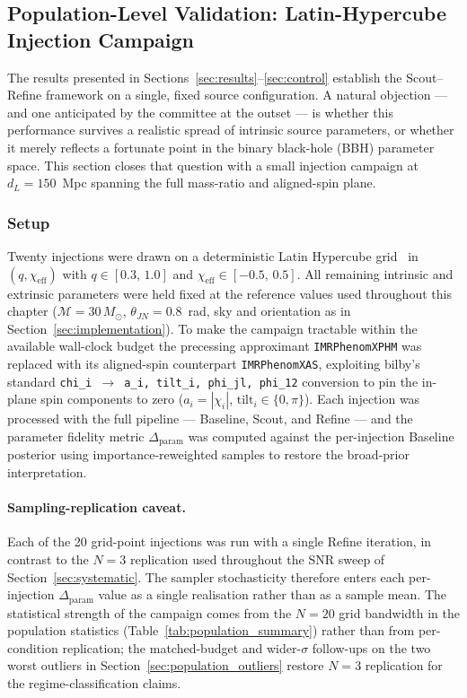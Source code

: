 \documentclass[12pt]{article}
\begin{document}
\clearpage

\subsection{Population-Level Validation: Latin-Hypercube Injection Campaign}
\label{sec:population_validation}

The results presented in Sections~\ref{sec:results}--\ref{sec:control} establish the Scout--Refine framework on a single, fixed source configuration. A natural objection --- and one anticipated by the committee at the outset --- is whether this performance survives a realistic spread of intrinsic source parameters, or whether it merely reflects a fortunate point in the binary black-hole (BBH) parameter space. This section closes that question with a small injection campaign at $d_L = 150$~Mpc spanning the full mass-ratio and aligned-spin plane.

\subsubsection{Setup}
Twenty injections were drawn on a deterministic Latin Hypercube grid~\citep{McKay1979} in $(q, \chi_{\mathrm{eff}})$ with $q \in [0.3,\,1.0]$ and $\chi_{\mathrm{eff}} \in [-0.5,\,0.5]$. All remaining intrinsic and extrinsic parameters were held fixed at the reference values used throughout this chapter ($\mathcal{M} = 30\,M_\odot$, $\theta_{JN} = 0.8$~rad, sky and orientation as in Section~\ref{sec:implementation}). To make the campaign tractable within the available wall-clock budget the precessing approximant \texttt{IMRPhenomXPHM} was replaced with its aligned-spin counterpart \texttt{IMRPhenomXAS}, exploiting bilby's standard \texttt{chi\_i $\to$ a\_i, tilt\_i, phi\_jl, phi\_12} conversion to pin the in-plane spin components to zero ($a_i = |\chi_i|$, $\mathrm{tilt}_i \in \{0, \pi\}$). Each injection was processed with the full pipeline --- Baseline, Scout, and Refine --- and the parameter fidelity metric $\Delta_{\mathrm{param}}$ was computed against the per-injection Baseline posterior using importance-reweighted samples to restore the broad-prior interpretation.

\paragraph{Sampling-replication caveat.}
Each of the 20 grid-point injections was run with a single Refine iteration, in contrast to the $N=3$ replication used throughout the SNR sweep of Section~\ref{sec:systematic}. The sampler stochasticity therefore enters each per-injection $\Delta_{\mathrm{param}}$ value as a single realisation rather than as a sample mean. The statistical strength of the campaign comes from the $N=20$ grid bandwidth in the population statistics (Table~\ref{tab:population_summary}) rather than from per-condition replication; the matched-budget and wider-$\sigma$ follow-ups on the two worst outliers in Section~\ref{sec:population_outliers} restore $N=3$ replication for the regime-classification claims.
\end{document}
